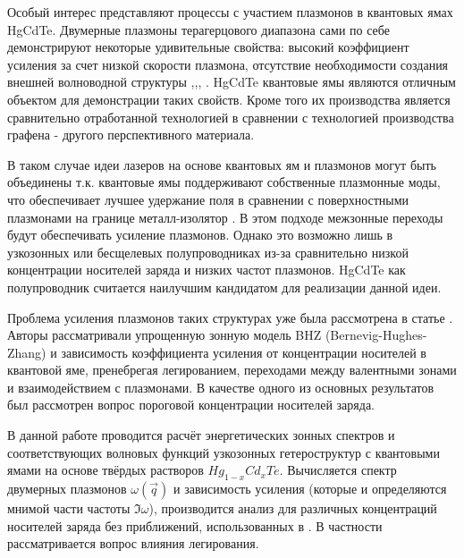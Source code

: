 \documentclass[../main.tex]{subfiles}
\begin{document}
Особый интерес представляют процессы с участием плазмонов в квантовых ямах HgCdTe. Двумерные плазмоны терагерцового диапазона сами по себе демонстрируют 
некоторые удивительные свойства: высокий коэффициент усиления за счет низкой скорости плазмона, отсутствие необходимости создания внешней волноводной 
структуры \cite{bergman2003surface},\cite{berini2012surface},\cite{oulton2009plasmon}, \cite{khurgin2012practicality}. HgCdTe квантовые ямы являются 
отличным объектом для демонстрации таких свойств. Кроме того их производства является сравнительно отработанной технологией в сравнении с 
технологией производства графена - другого перспективного материала.

В таком случае идеи лазеров на основе квантовых ям и плазмонов могут быть объединены \cite{kapralov2019feasibility} т.к. квантовые ямы поддерживают собственные 
плазмонные моды, что обеспечивает лучшее удержание поля в сравнении с поверхностными плазмонами на границе металл-изолятор \cite{stern1967polarizability}.
В этом подходе межзонные переходы будут обеспечивать усиление плазмонов. Однако это возможно лишь в узкозонных или бесщелевых полупроводниках
из-за сравнительно низкой концентрации носителей заряда и низких частот плазмонов. HgCdTe как полупроводник считается наилучшим кандидатом 
для реализации данной идеи.



Проблема усиления плазмонов таких структурах уже была рассмотрена в статье \cite{kapralov2019feasibility}. Авторы рассматривали упрощенную зонную модель
BHZ (Bernevig-Hughes-Zhang) \cite{bernevig2006quantum} и зависимость коэффициента усиления от концентрации носителей в квантовой яме, пренебрегая 
легированием, переходами между валентными зонами и взаимодействием с плазмонами. В качестве одного из основных результатов был рассмотрен 
вопрос пороговой концентрации носителей заряда.

В данной работе проводится расчёт энергетических зонных спектров и соответствующих волновых функций узкозонных гетероструктур с квантовыми
ямами на основе твёрдых растворов $Hg_{1-x}Cd_{x}Te$. Вычисляется спектр двумерных плазмонов $\omega(\vec q)$ и зависимость усиления
(которые и определяются мнимой части частоты $\Im \omega$), производится анализ для различных концентраций носителей заряда без приближений, 
использованных в \cite{kapralov2019feasibility}. В частности рассматривается вопрос влияния легирования.
\end{document}
